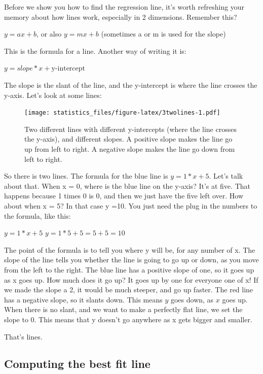\documentclass[]{book}
\begin{document}
Before we show you how to find the regression line, it's worth refreshing your memory about how lines work, especially in 2 dimensions. Remember this?

\(y = ax + b\), or also \(y = mx + b\) (sometimes a or m is used for the slope)

This is the formula for a line. Another way of writing it is:

\(y = slope * x + \text{y-intercept}\)

The slope is the slant of the line, and the y-intercept is where the line crosses the y-axis. Let's look at some lines:

\begin{figure}
\centering
\texttt{[image: statistics\_files/figure-latex/3twolines-1.pdf]}
\caption{\label{fig:3twolines}Two different lines with different y-intercepts (where the line crosses the y-axis), and different slopes. A positive slope makes the line go up from left to right. A negative slope makes the line go down from left to right.}
\end{figure}

So there is two lines. The formula for the blue line is \(y = 1*x + 5\). Let's talk about that. When x = 0, where is the blue line on the y-axis? It's at five. That happens because 1 times 0 is 0, and then we just have the five left over. How about when x = 5? In that case y =10. You just need the plug in the numbers to the formula, like this:

\(y = 1*x + 5\)
\(y = 1*5 + 5 = 5+5 =10\)

The point of the formula is to tell you where y will be, for any number of x. The slope of the line tells you whether the line is going to go up or down, as you move from the left to the right. The blue line has a positive slope of one, so it goes up as x goes up. How much does it go up? It goes up by one for everyone one of x! If we made the slope a 2, it would be much steeper, and go up faster. The red line has a negative slope, so it slants down. This means \(y\) goes down, as \(x\) goes up. When there is no slant, and we want to make a perfectly flat line, we set the slope to 0. This means that y doesn't go anywhere as x gets bigger and smaller.

That's lines.

\hypertarget{computing-the-best-fit-line}{%
\subsection{Computing the best fit line}\label{computing-the-best-fit-line}}
\end{document}
